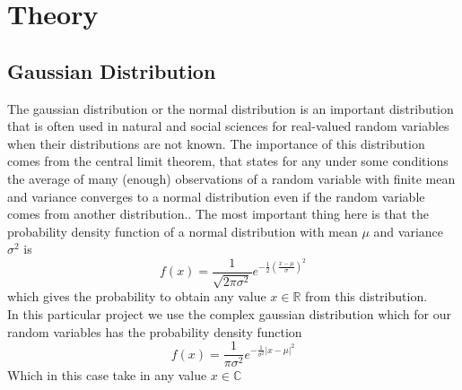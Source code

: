 \section{Theory}\label{sec:theory}
\subsection{Gaussian Distribution}
The gaussian distribution or the normal distribution is an important distribution that is often used in natural and social sciences for real-valued random variables when their distributions are not known. The importance of this distribution comes from the central limit theorem, that states for any under some conditions the average of many (enough) observations of a random variable with finite mean and variance converges to a normal distribution even if the random variable comes from another distribution.\cite{WikipediaGaussian}. The most important thing here is that the probability density function of a normal distribution with mean $\mu$ and variance $\sigma^2$ is
\begin{equation}
	f(x) = \frac{1}{\sqrt{2\pi\sigma^2}}e^{-\frac{1}{2}(\frac{x-\mu}{\sigma})^2}
\end{equation}
which gives the probability to obtain any value $x\in\mathbb{R}$ from this distribution.\\
In this particular project we use the complex gaussian distribution which for our random variables has the probability density function
\begin{equation}
	f(x) = \frac{1}{\pi\sigma^2}e^{-\frac{1}{\sigma^2}|x-\mu|^2}
\end{equation}
Which in this case take in any value $x\in\mathbb{C}$

